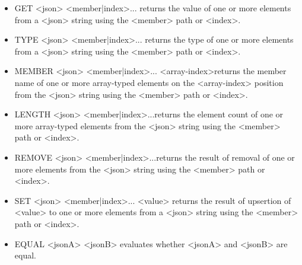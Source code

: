 \begin{itemize}
\item
GET <json> <member|index>... returns the value of one or more elements from a <json> string using the <member> path or <index>.

\item
TYPE <json> <member|index>... returns the type of one or more elements from a <json> string using the <member> path or <index>.

\item
MEMBER <json> <member|index>... <array-index>returns the member name of one or more array-typed elements on the <array-index> position from the <json> string using the <member> path or <index>.

\item
LENGTH <json> <member|index>...returns the element count of one or more array-typed elements from the <json> string using the <member> path or <index>.

\item
REMOVE <json> <member|index>...returns the result of removal of one or more elements from the <json> string using the <member> path or <index>.

\item
SET <json> <member|index>... <value> returns the result of upsertion of <value> to one or more elements from a <json> string using the <member> path or <index>.

\item
EQUAL <jsonA> <jsonB> evaluates whether <jsonA> and <jsonB> are equal.
\end{itemize}




































